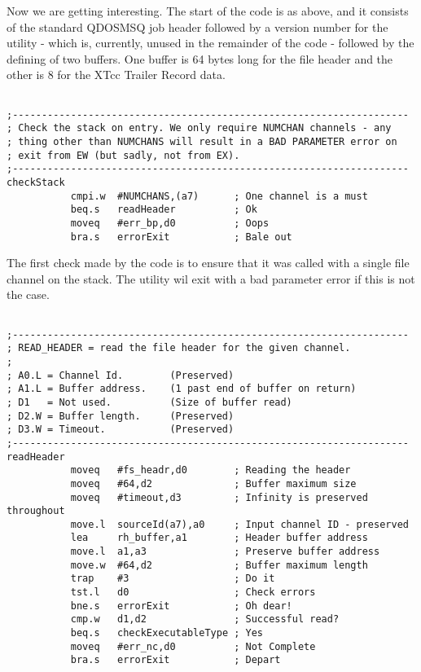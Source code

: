 Now we are getting interesting. The start of the code is as above, and it consists of the standard QDOSMSQ job header followed by a version number for the utility - which is, currently, unused in the remainder of the code -  followed by the defining of two buffers. One buffer is 64 bytes long for the file header and the other is 8 for the XTcc Trailer Record data.

\begin{lstlisting}[firstnumber=last,caption={XTcc - Channel Checking}]

;--------------------------------------------------------------------
; Check the stack on entry. We only require NUMCHAN channels - any
; thing other than NUMCHANS will result in a BAD PARAMETER error on
; exit from EW (but sadly, not from EX).
;--------------------------------------------------------------------
checkStack
           cmpi.w  #NUMCHANS,(a7)      ; One channel is a must
           beq.s   readHeader          ; Ok
           moveq   #err_bp,d0          ; Oops
           bra.s   errorExit           ; Bale out
\end{lstlisting}

The first check made by the code is to ensure that it was called with a single file channel on the stack. The utility wil exit with a bad parameter error if this is not the case.


\begin{lstlisting}[firstnumber=last,caption={XTcc - Read the File Header}]

;--------------------------------------------------------------------
; READ_HEADER = read the file header for the given channel.
;
; A0.L = Channel Id.        (Preserved)
; A1.L = Buffer address.    (1 past end of buffer on return)
; D1   = Not used.          (Size of buffer read)
; D2.W = Buffer length.     (Preserved)
; D3.W = Timeout.           (Preserved)
;--------------------------------------------------------------------
readHeader
           moveq   #fs_headr,d0        ; Reading the header
           moveq   #64,d2              ; Buffer maximum size
           moveq   #timeout,d3         ; Infinity is preserved throughout
           move.l  sourceId(a7),a0     ; Input channel ID - preserved
           lea     rh_buffer,a1        ; Header buffer address
           move.l  a1,a3               ; Preserve buffer address
           move.w  #64,d2              ; Buffer maximum length
           trap    #3                  ; Do it
           tst.l   d0                  ; Check errors
           bne.s   errorExit           ; Oh dear!
           cmp.w   d1,d2               ; Successful read?
           beq.s   checkExecutableType ; Yes
           moveq   #err_nc,d0          ; Not Complete
           bra.s   errorExit           ; Depart
\end{lstlisting}

